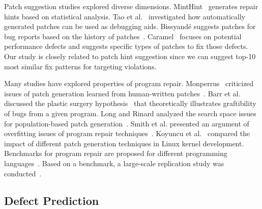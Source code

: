 Patch suggestion studies explored diverse dimensions. MintHint~\cite{kaleeswaran2014minthint} generates repair hints based on statistical analysis. Tao et al.~\cite{tao2014automatically} investigated how automatically generated patches can be used as debugging aids. 
Bissyand{\'e} suggests patches for bug reports based on the history of patches~\cite{bissyande2015harvesting}. 
Caramel~\cite{nistor2015caramel} focuses on potential performance defects and suggests specific types of patches to fix those defects. Our study is closely related to patch hint suggestion since we can suggest top-10 most similar fix patterns for targeting violations. 

Many studies have explored properties of program repair. Monperrus~\cite{monperrus2014critical} criticized issues of patch generation learned from human-written patches~\cite{kim2013automatic}. Barr et al. discussed the plastic surgery hypothesis~\cite{barr2014plastic} that theoretically illustrates graftibility of bugs from a given program.
Long and Rinard analyzed the search space issues for population-based patch generation~\cite{long2016analysis}. Smith et al. presented an argument of overfitting issues of program repair techniques~\cite{smith2015cure}. Koyuncu et al.~\cite{koyuncu2017impact} compared the impact of different patch generation techniques in Linux kernel development.
Benchmarks for program repair are proposed for different programming languages~\cite{le2015manybugs, just2014defects4j}. Based on a benchmark, a large-scale replication study was conducted~\cite{martinez2017automatic}.



\subsection{Defect Prediction}

